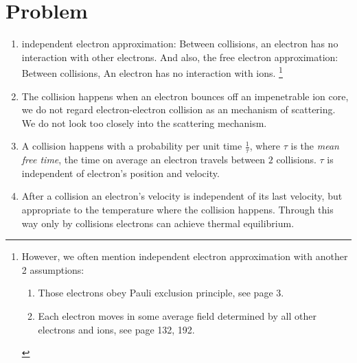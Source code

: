 \documentclass[12pt]{article}
\newcommand*{\RMN}[1]{\uppercase\expandafter{\romannumeral#1}}
\begin{document}
\section*{Problem \RMN{1}}
\begin{enumerate}
	\item independent electron approximation: Between collisions, an electron has no interaction with other electrons.
	      And also, the free electron approximation: Between collisions, An electron has no interaction with ions.
	      \footnote{However, we often mention independent electron approximation with another 2 assumptions:
	      	\begin{enumerate}[1.]
	      		\item Those electrons obey Pauli exclusion principle, see \cite{martin2004electronic} page 3.
	      		\item Each electron moves in some average field determined by all other electrons and ions, see \cite{ashcroft1976nd} page 132, 192.
	      	\end{enumerate}
	      }
	\item The collision happens when an electron bounces off an impenetrable ion core, we do not regard electron-electron collision as an
	      mechanism of scattering. We do not look too closely into the scattering mechanism.
	\item A collision happens with a probability per unit time $\frac{1}{\tau}$, where $\tau$ is the \textit{mean free time}, the time on average
	      an electron travels between $2$ collisions. $\tau$ is independent of electron's position and velocity.
	\item After a collision an electron's velocity is independent of its last velocity, but appropriate to the temperature where the collision happens. Through this way only by collisions electrons can achieve thermal equilibrium.
\end{enumerate}
\end{document}
